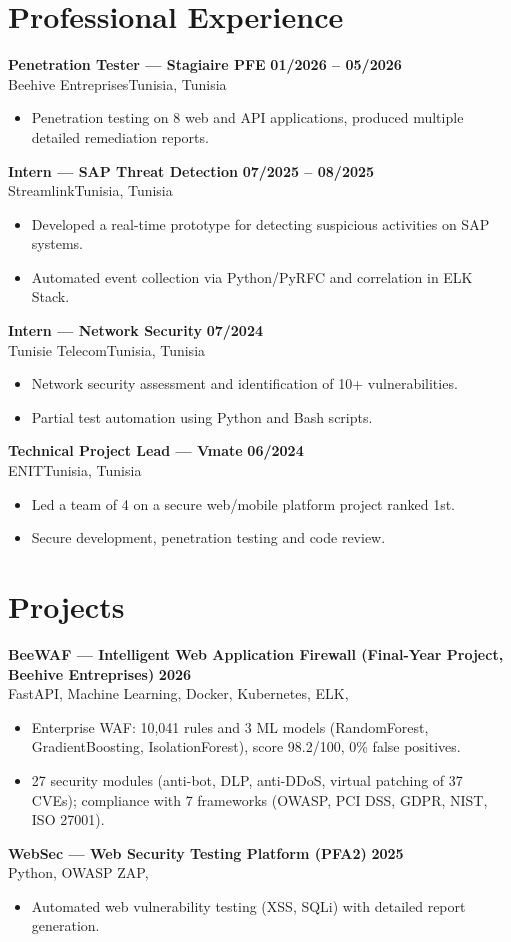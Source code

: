 \documentclass[a4paper,10pt]{article}
\newcommand{\cventry}[4]{%
  \textbf{#1} \hfill \textbf{#4}\\[1pt]
  #2{\ifx\relax#3\relax\else, #3\fi}\par\vspace{2pt}}
\begin{document}
\section{Professional Experience}
\cventry{Penetration Tester --- Stagiaire PFE}{Beehive Entreprises}{Tunisia}{01/2026 -- 05/2026}
\begin{itemize}
  \item Penetration testing on 8 web and API applications, produced multiple detailed remediation reports.
\end{itemize}
\cventry{Intern — SAP Threat Detection}{Streamlink}{Tunisia}{07/2025 -- 08/2025}
\begin{itemize}
  \item Developed a real-time prototype for detecting suspicious activities on SAP systems.
  \item Automated event collection via Python/PyRFC and correlation in ELK Stack.
\end{itemize}
\cventry{Intern — Network Security}{Tunisie Telecom}{Tunisia}{07/2024}
\begin{itemize}
  \item Network security assessment and identification of 10+ vulnerabilities.
  \item Partial test automation using Python and Bash scripts.
\end{itemize}
\cventry{Technical Project Lead — Vmate}{ENIT}{Tunisia}{06/2024}
\begin{itemize}
  \item Led a team of 4 on a secure web/mobile platform project ranked 1st.
  \item Secure development, penetration testing and code review.
\end{itemize}
\section{Projects}
\cventry{BeeWAF — Intelligent Web Application Firewall (Final-Year Project, Beehive Entreprises)}{FastAPI, Machine Learning, Docker, Kubernetes, ELK}{}{2026}
\begin{itemize}
  \item Enterprise WAF: 10,041 rules and 3 ML models (RandomForest, GradientBoosting, IsolationForest), score 98.2/100, 0\% false positives.
  \item 27 security modules (anti-bot, DLP, anti-DDoS, virtual patching of 37 CVEs); compliance with 7 frameworks (OWASP, PCI DSS, GDPR, NIST, ISO 27001).
\end{itemize}
\cventry{WebSec — Web Security Testing Platform (PFA2)}{Python, OWASP ZAP}{}{2025}
\begin{itemize}
  \item Automated web vulnerability testing (XSS, SQLi) with detailed report generation.
\end{itemize}
\end{document}
